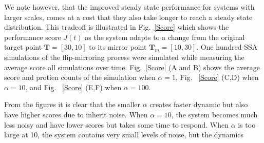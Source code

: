 \documentclass[12pt]{article}
\begin{document}
We note however, that the improved steady state performance for systems with larger scales, comes at a cost that they also take longer to reach a steady state distribution. This tradeoff is illustrated in Fig.\ \ref{Score} which shows the performance score $J(t)$ as the system adapts to a change from the original target point $\mathbf{T} = [30,10]$ to its mirror point $\mathbf{T}_m = [10,30]$.  
One hundred SSA simulations of the flip-mirroring process were simulated while measuring the average score all simulations over time. Fig.\ \ref{Score} (A and B) shows the average score and protien counts of the simulation when $\alpha=1$, Fig. \ \ref{Score} (C,D) when $\alpha = 10$, and Fig. \ \ref{Score} (E,F) when $\alpha = 100$. 

From the figures it is clear that the smaller $\alpha$ creates faster dynamic but also have higher scores due to inherit noise. When $\alpha = 10$, the system becomes much less noisy and have lower scores but takes some time to respond. When $\alpha$ is too large at 10, the system contains very small levels of noise, but the dynamics

\end{document}
